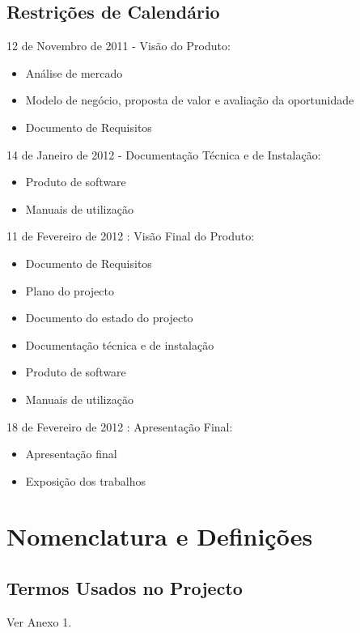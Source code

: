 \subsection{Restrições de Calendário}
\begin{description}
    \item 12 de Novembro de 2011 - Visão do Produto: 
        \begin{itemize}
            \item Análise de mercado
            \item Modelo de negócio, proposta de valor e avaliação da oportunidade
            \item Documento de Requisitos
        \end{itemize}
    \item 14 de Janeiro de 2012 - Documentação Técnica e de Instalação: 
        \begin{itemize}
            \item Produto de software
            \item Manuais de utilização
        \end{itemize}
    \item 11 de Fevereiro de 2012 : Visão Final do Produto:
        \begin{itemize}
            \item Documento de Requisitos
            \item Plano do projecto
            \item Documento do estado do projecto
            \item Documentação técnica e de instalação
            \item Produto de software
            \item Manuais de utilização
        \end{itemize}
    \item 18 de Fevereiro de 2012 : Apresentação Final: 
        \begin{itemize}
            \item Apresentação final
            \item Exposição dos trabalhos
        \end{itemize}
\end{description}

\section{Nomenclatura e Definições}
\subsection{Termos Usados no Projecto}
Ver Anexo 1.
